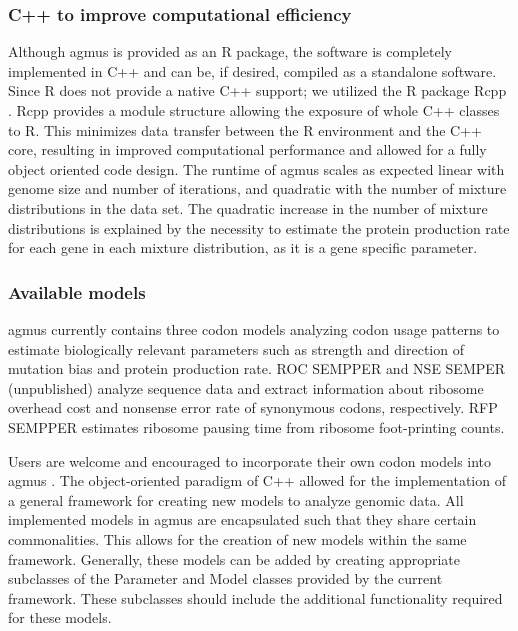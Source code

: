 \documentclass{bioinfo}
\newcommand{\package}{agmus } %
\begin{document}
\subsubsection*{C++ to improve computational efficiency}
Although \package is provided as an R package, the software is completely implemented in C++ and can be, if desired, compiled as a standalone software.
Since R does not provide a native C++ support; we utilized the R package Rcpp \citep{rcpp_package}. 
Rcpp provides a module structure allowing the exposure of whole C++ classes to R. 
This minimizes data transfer between the R environment and the C++ core, resulting in improved computational performance and allowed for a fully object oriented code design. 
The runtime of \package scales as expected linear with genome size and number of iterations, and quadratic with the number of mixture distributions in the data set. The quadratic increase in the number of mixture distributions is explained by the necessity to estimate the protein production rate for each gene in each mixture distribution, as it is a gene specific parameter.  

\subsubsection*{Available models}
\package currently contains three codon models analyzing codon usage patterns to estimate biologically relevant parameters such as strength and direction of mutation bias and protein production rate. 
ROC SEMPPER \cite{gilchrist2015} and NSE SEMPER (unpublished) analyze sequence data and extract information about ribosome overhead cost and nonsense error rate of synonymous codons, respectively. 
RFP SEMPPER estimates ribosome pausing time from ribosome foot-printing counts.

Users are welcome and encouraged to incorporate their own codon models into \package. The object-oriented paradigm of C++ allowed for the implementation of a general framework for creating new models to analyze genomic data. All implemented models in \package are encapsulated such that they share certain commonalities. This allows for the creation of new models within the same framework. Generally, these models can be added by creating appropriate subclasses of the Parameter and Model classes provided by the current framework. These subclasses should include the additional functionality required for these models. 



\end{document}
